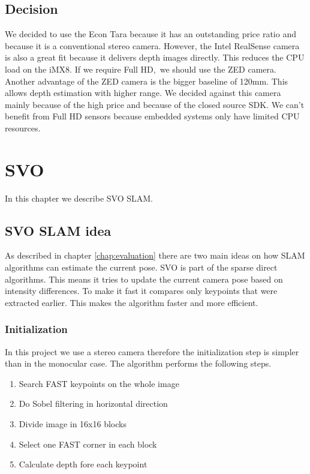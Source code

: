 \documentclass[11pt,a4paper,titlepage,oneside]{report}
\begin{document}
\section{Decision}

We decided to use the Econ Tara because it has an outstanding price ratio and because it is a conventional stereo camera. However, the Intel RealSense camera is also a great fit because it delivers depth images directly. This reduces the CPU load on the iMX8. If we require Full HD, we should use the ZED camera. Another advantage of the ZED camera is the bigger baseline of 120mm. This allows depth estimation with higher range. We decided against this camera mainly because of the high price and because of the closed source SDK. We can't benefit from Full HD sensors because embedded systems only have limited CPU resources.



\chapter{SVO}
In this chapter we describe SVO SLAM.

\section{SVO SLAM idea}
As described in chapter \ref{chap:evaluation} there are two main ideas on how SLAM algorithms can estimate the current pose. SVO is part of the sparse direct algorithms. This means it tries to update the current camera pose based on intensity differences. To make it fast it compares only keypoints that were extracted earlier. This makes the algorithm faster and more efficient.

\subsection{Initialization}\label{sec:initialization}
In this project we use a stereo camera therefore the initialization step is simpler than in the monocular case. The algorithm performs the following steps.
\begin{enumerate}
	\item{Search FAST keypoints on the whole image}
	\item{Do Sobel filtering in horizontal direction}
	\item{Divide image in 16x16 blocks}
	\item{Select one FAST corner in each block}
	\item{Calculate depth fore each keypoint}
\end{enumerate}
\end{document}
